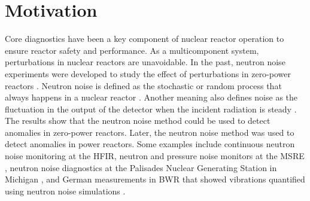 \label{ch:intro}

\section{Motivation}

Core diagnostics have been a key component of nuclear reactor operation to ensure reactor safety and performance. As a multicomponent system, perturbations in nuclear reactors are unavoidable. In the past, neutron noise experiments were developed to study the effect of perturbations in zero-power reactors \cite{akcasuApplicationLangevinTechnique1966,cohnSimplifiedTheoryPile1960,moorePowerNoiseTransfer1959}. Neutron noise is defined as the stochastic or random process that always happens in a nuclear reactor \cite{saitoTheoryPowerReactor1974b}. Another meaning also defines noise as the fluctuation in the output of the detector when the incident radiation is steady \cite{pacilioAnalysisReactorNoise1979}. The results show that the neutron noise method could be used to detect anomalies in zero-power reactors. Later, the neutron noise method was used to detect anomalies in power reactors. Some examples include continuous neutron noise monitoring at the \gls*{HFIR}, neutron and pressure noise monitors at the \gls*{MSRE} \cite{fryExperienceReactorMalfunction1971}, neutron noise diagnostics at the Palisades Nuclear Generating Station in Michigan \cite{fryAnalysisNeutrondensityOscillations1975}, and German measurements in \gls*{BWR} that showed vibrations quantified using neutron noise simulations \cite{wachInvestigationJointEffect1974}. 

